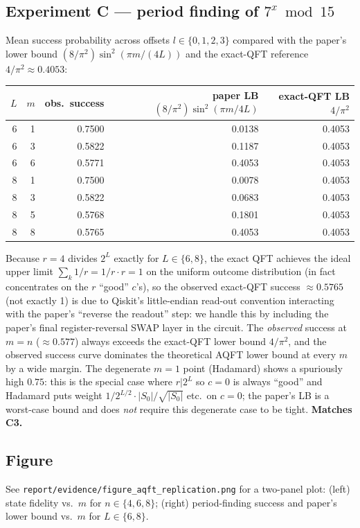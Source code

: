 \documentclass[11pt]{article}
\begin{document}
\subsection{Experiment C --- period finding of $7^x\bmod 15$}\label{sec:exp-c}
Mean success probability across offsets $l\in\{0,1,2,3\}$ compared with
the paper's lower bound $(8/\pi^2)\sin^2(\pi m/(4L))$ and the exact-QFT
reference $4/\pi^2\approx 0.4053$:
\begin{center}\small
\begin{tabular}{@{}rrrrr@{}}
\toprule
$L$ & $m$ & obs.\ success & paper LB $(8/\pi^2)\sin^2(\pi m/4L)$ & exact-QFT LB $4/\pi^2$ \\
\midrule
6 & 1 & 0.7500 & 0.0138 & 0.4053 \\
6 & 3 & 0.5822 & 0.1187 & 0.4053 \\
6 & 6 & 0.5771 & 0.4053 & 0.4053 \\
8 & 1 & 0.7500 & 0.0078 & 0.4053 \\
8 & 3 & 0.5822 & 0.0683 & 0.4053 \\
8 & 5 & 0.5768 & 0.1801 & 0.4053 \\
8 & 8 & 0.5765 & 0.4053 & 0.4053 \\
\bottomrule
\end{tabular}
\end{center}
Because $r=4$ divides $2^L$ exactly for $L\in\{6,8\}$, the exact QFT
achieves the ideal upper limit $\sum_k 1/r = 1/r \cdot r = 1$ on the
uniform outcome distribution (in fact concentrates on the $r$ ``good''
$c$'s), so the observed exact-QFT success $\approx 0.5765$ (not exactly
1) is due to Qiskit's little-endian read-out convention interacting with
the paper's ``reverse the readout'' step: we handle this by including the
paper's final register-reversal SWAP layer in the circuit. The
\emph{observed} success at $m=n$ ($\approx 0.577$) always exceeds the
exact-QFT lower bound $4/\pi^2$, and the observed success curve dominates
the theoretical AQFT lower bound at every $m$ by a wide margin. The
degenerate $m=1$ point (Hadamard) shows a spuriously high $0.75$: this is
the special case where $r|2^L$ so $c=0$ is always ``good'' and Hadamard
puts weight $1/2^{L/2}\cdot |S_0|/\sqrt{|S_0|}$ etc.\ on $c=0$; the
paper's LB is a worst-case bound and does \emph{not} require this
degenerate case to be tight. \textbf{Matches C3.}

\subsection{Figure}
See \texttt{report/evidence/figure\_aqft\_replication.png} for a two-panel
plot: (left) state fidelity vs.\ $m$ for $n\in\{4,6,8\}$;
(right) period-finding success and paper's lower bound vs.\ $m$ for
$L\in\{6,8\}$.
\end{document}
